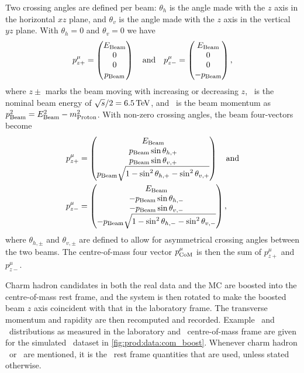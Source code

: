 Two crossing angles are defined per beam: $\theta_{h}$ is the angle made with 
the $z$ axis in the horizontal $xz$ plane, and $\theta_{v}$ is the angle made 
with the $z$ axis in the vertical $yz$ plane.
With $\theta_{h} = 0$ and $\theta_{v} = 0$ we have
\begin{equation}
  p_{z+}^{\mu} = \begin{pmatrix}E_{\textnormal{Beam}}\\0\\0\\p_{\textnormal{Beam}}\end{pmatrix}
    \quad\text{and}\quad
  p_{z-}^{\mu} = \begin{pmatrix}E_{\textnormal{Beam}}\\0\\0\\-p_{\textnormal{Beam}}\end{pmatrix},
\end{equation}
where $z\pm$ marks the beam moving with increasing or decreasing $z$, \Ebeam\ 
is the nominal beam energy of $\sqrts/2 = \SI{6.5}{\TeV}$, and \pbeam\ is the 
beam momentum as $p_{\textnormal{Beam}}^{2} = E_{\textnormal{Beam}}^{2} - m_{\text{Proton}}^{2}$.
With non-zero crossing angles, the beam four-vectors become
\begin{align}
  p_{z+}^{\mu} &= \begin{pmatrix}
    E_{\textnormal{Beam}}\\
    p_{\textnormal{Beam}}\sin{\theta_{h,+}}\\
    p_{\textnormal{Beam}}\sin{\theta_{v,+}}\\
    p_{\textnormal{Beam}}\sqrt{1 - \sin^{2}{\theta_{h,+}} - \sin^{2}{\theta_{v,+}}}
  \end{pmatrix}\quad\text{and}\nonumber\\
  p_{z-}^{\mu} &= \begin{pmatrix}
    E_{\textnormal{Beam}}\\
    -p_{\textnormal{Beam}}\sin{\theta_{h,-}}\\
    -p_{\textnormal{Beam}}\sin{\theta_{v,-}}\\
    -p_{\textnormal{Beam}}\sqrt{1 - \sin^{2}{\theta_{h,-}} - \sin^{2}{\theta_{v,-}}}
  \end{pmatrix},
\end{align}
where $\theta_{h,\pm}$ and $\theta_{v,\pm}$ are defined to allow for 
asymmetrical crossing angles between the two beams.
The centre-of-mass four vector $p_{\text{CoM}}^{\mu}$ is then the sum of 
$p_{z+}^{\mu}$ and $p_{z-}^{\mu}$.

Charm hadron candidates in both the real data and the \ac{MC} are boosted into 
the centre-of-mass rest frame, and the system is then rotated to make the 
boosted beam $z$ axis coincident with that in the laboratory frame.
The transverse momentum and rapidity are then recomputed and recorded.
Example \pT\ and \rapidity\ distributions as measured in the laboratory and 
\pp\ centre-of-mass frame are given for the simulated \DzToKpi\ dataset in 
\cref{fig:prod:data:com_boost}.
Whenever charm hadron \pT\ or \rapidity\ are mentioned, it is the \pp\ rest 
frame quantities that are used, unless stated otherwise.

